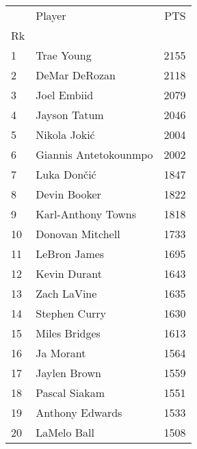 \begin{tabular}{llr}

{} &                 Player &  PTS \\
Rk &                        &       \\

1  &             Trae Young &  2155 \\
2  &          DeMar DeRozan &  2118 \\
3  &            Joel Embiid &  2079 \\
4  &           Jayson Tatum &  2046 \\
5  &           Nikola Jokić &  2004 \\
6  &  Giannis Antetokounmpo &  2002 \\
7  &            Luka Dončić &  1847 \\
8  &           Devin Booker &  1822 \\
9  &     Karl-Anthony Towns &  1818 \\
10 &       Donovan Mitchell &  1733 \\
11 &           LeBron James &  1695 \\
12 &           Kevin Durant &  1643 \\
13 &            Zach LaVine &  1635 \\
14 &          Stephen Curry &  1630 \\
15 &          Miles Bridges &  1613 \\
16 &              Ja Morant &  1564 \\
17 &           Jaylen Brown &  1559 \\
18 &          Pascal Siakam &  1551 \\
19 &        Anthony Edwards &  1533 \\
20 &            LaMelo Ball &  1508 \\

\end{tabular}
